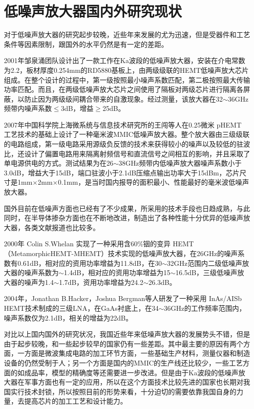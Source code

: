 \section{低噪声放大器国内外研究现状}

对于低噪声放大器的研究起步较晚，近些年来发展的尤为迅速，但是受器件和工艺条件等因素限制，跟国外的水平仍然是有一定的差距。

2001年邹泉涌团队设计出了一款工作在Ka波段的低噪声放大器，安装在介电常数为2.2，板材厚度0.254mm的RD5880基板上，由两级级联的HEMT低噪声放大芯片组成。在整个设计的过程中，第一级按照最小噪声系数匹配，第二极按照最大传输功率匹配。而且，在两级低噪声放大芯片之间使用了隔板对两级芯片进行隔离各屏蔽，以防止因为两级级间耦合带来的自激现象。经过测量，该放大器在32$\sim$36GHz频带内噪声系数$\leqslant$3dB，增益$\geqslant$25dB。

2007年中国科学院上海微系统与信息技术研究所的王闯等人在0.25微米 pHEMT 工艺技术的基础上设计了一种毫米波MMIC低噪声放大器。整个放大器由三级级联的电路组成，第一级电路采用源级负反馈的技术来获得较小的噪声以及较低的驻波比，还设计了偏置电路用来隔离射频信号和直流信号之间相互的影响，并且采取了单电源供电的方式。测试结果为在26$\sim$38GHz频带内低噪声放大器噪声系数小于3.0dB，增益大于15dB，端口驻波小于2.1dB压缩点输出功率大于15dBm，芯片尺寸是1mm$\times$2mm$\times$0.1mm，是当时国内报导的面积最小、性能最好的毫米波低噪声放大器。

国外目前在低噪声方面也已经有了不少成果，所采用的技术手段也日趋成熟，与此同时，在半导体掺杂方面也在不断地改进，制造出了各种性能十分优异的低噪声放大器，各类文献报道也比较多。

2000年 Colin S.Whelan 实现了一种采用含60\%铟的变异 HEMT （Metamorphic\linebreak[4] HEMT-MHEMT）技术实现的低噪声放大器，在26GHz的噪声系数有0.61dB，相对应的资用功率增益为11.8dB，在30$\sim$32GHz范围内二级低噪声放大器的噪声系数为$\sim$1.4dB，相对应的资用功率增益为15$\sim$16.5dB，三级低噪声放大器的噪声为1.4$\sim$1.7dB，资用功率增益为24.2$\sim$26.3dB。

2004年，Jonathan B.Hacker，Joshua Bergman等人研发了一种采用 InAs/AISb HEMT技术制成的三级LNA，在GaAs衬底上，在34$\sim$36GHz的工作频率范围内，噪声系数仅为2.1dB，相关的增益为22dB。

对比以上国内国外的研究状况，我国近些年来低噪声放大器的发展势头不错，但是由于起步较晚，和一些起步较早的国家仍有一些差距。其中最主要的原因有两个方面，一方面是微波集成电路的加工环节方面，一些基础生产材料，测量仪器和制造设备的仍然受制于人；另一个方面是国内的MMIC的生产线还比较少，一些工艺方面的如成品率，模型的精确度等还需要进一步改进。但是由于Ka波段的低噪声放大器在军事方面也有一定的应用，所以在这个方面技术比较先进的国家也长期对我国实行技术封锁，所以按照目前的形势来看，十分迫切的需要依靠我国自身的力量，去提高芯片的加工工艺和设计能力。


